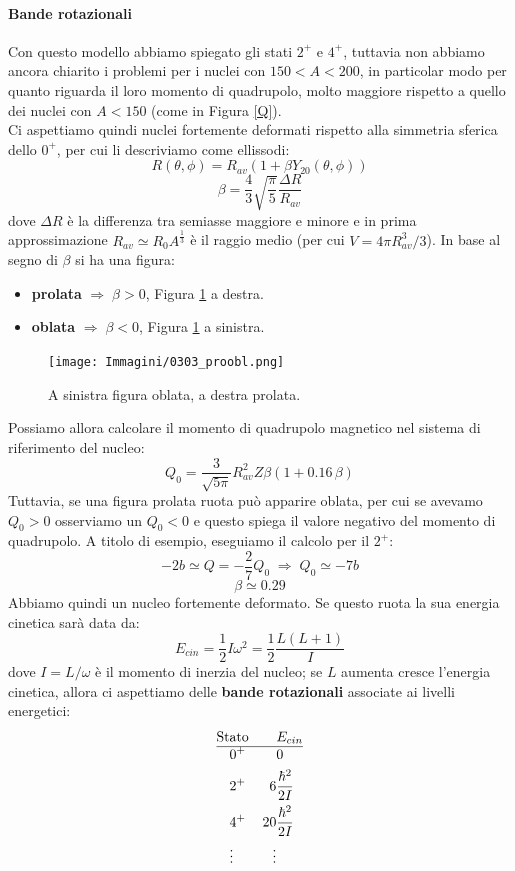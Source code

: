 \paragraph{Bande rotazionali} Con questo modello abbiamo spiegato gli stati $2^+$ e $4^+$, tuttavia non abbiamo ancora chiarito i problemi per i nuclei con $150<A<200$, in particolar modo per quanto riguarda il loro momento di quadrupolo, molto maggiore rispetto a quello dei nuclei con $A<150$ (come in Figura \ref{Q}). \\
Ci aspettiamo quindi nuclei fortemente deformati rispetto alla simmetria sferica dello $0^+$, per cui li descriviamo come ellissodi:
$$R(\theta,\phi) = R_{av}(1+\beta Y_{20}(\theta,\phi))$$
$$\beta = \frac{4}{3}\sqrt{\frac{\pi}{5}} \frac{\Delta R}{R_{av}}$$
dove $\Delta R$ è la differenza tra semiasse maggiore e minore e in prima approssimazione $R_{av}\simeq R_0 A^{\frac{1}{3}}$ è il raggio medio (per cui $V=4\pi R_{av}^3/3$). In base al segno di $\beta$ si ha una figura:
\begin{itemize}
    \item \textbf{prolata} $\Rightarrow \; \beta >0$, Figura \ref{0303_proobl} a destra.
    \item \textbf{oblata} $\Rightarrow \; \beta <0$, Figura \ref{0303_proobl} a sinistra.
\end{itemize}
\begin{figure}[h]
    \centering
    \texttt{[image: Immagini/0303\_proobl.png]}
    \caption{A sinistra figura oblata, a destra prolata.}
    \label{0303_proobl}
\end{figure}
Possiamo allora calcolare il momento di quadrupolo magnetico nel sistema di riferimento del nucleo:
$$Q_0 = \frac{3}{\sqrt{5\pi}}R^2_{av}Z\beta(1+0.16\,\beta)$$
Tuttavia, se una figura prolata ruota può apparire oblata, per cui se avevamo $Q_0>0$ osserviamo un $Q_0<0$ e questo spiega il valore negativo del momento di quadrupolo. A titolo di esempio, eseguiamo il calcolo per il $2^+$:
$$-2\unit{b} \simeq Q = -\frac{2}{7} Q_0 \; \Rightarrow \; Q_0 \simeq -7\unit{b}$$
$$\beta \simeq 0.29$$
Abbiamo quindi un nucleo fortemente deformato. Se questo ruota la sua energia cinetica sarà data da:
$$E_{cin} = \frac{1}{2} I \omega^2=\frac{1}{2}\frac{L(L+1)}{I}$$
dove $I=L/\omega$ è il momento di inerzia del nucleo; se $L$ aumenta cresce l'energia cinetica, allora ci aspettiamo delle \textbf{bande rotazionali} associate ai livelli energetici:
\begin{displaymath}
\begin{aligned}
\text{St}&\text{ato} & &E_{cin} \\
\hline
&0^+ & &0 \\
&2^+ & 6&\frac{\hbar^2}{2I} \\
&4^+ & 20&\frac{\hbar^2}{2I} \\
&\vdots & \vdots&
\end{aligned}
\end{displaymath}
